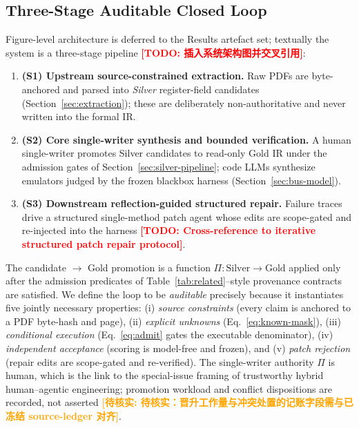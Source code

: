 \documentclass[preprint,review]{elsarticle}
\theoremstyle{definition}
\newcommand{\todo}[1]{\textcolor{red}{\textbf{[TODO: #1]}}}
\newcommand{\unverified}[1]{\textcolor{orange}{\textbf{[待核实: #1]}}}
\begin{document}
\subsection{Three-Stage Auditable Closed Loop}
\label{sec:architecture}

Figure-level architecture is deferred to the Results artefact set; textually the system is a
three-stage pipeline \todo{插入系统架构图并交叉引用}:

\begin{enumerate}
\item \textbf{(S1) Upstream source-constrained extraction.} Raw PDFs are byte-anchored and
parsed into \emph{Silver} register-field candidates (Section~\ref{sec:extraction}); these
are deliberately non-authoritative and never written into the formal IR.
\item \textbf{(S2) Core single-writer synthesis and bounded verification.} A human
single-writer promotes Silver candidates to read-only Gold IR under the admission gates of
Section~\ref{sec:silver-pipeline}; code LLMs synthesize emulators judged by the frozen
blackbox harness (Section~\ref{sec:bus-model}).
\item \textbf{(S3) Downstream reflection-guided structured repair.} Failure traces drive a
structured single-method patch agent whose edits are scope-gated and re-injected into the
harness \todo{Cross-reference to iterative structured patch repair protocol}.
\end{enumerate}

The candidate $\to$ Gold promotion is a function $\Pi:\mathrm{Silver}\rightarrow
\mathrm{Gold}$ applied only after the admission predicates of
Table~\ref{tab:related}--style provenance contracts are satisfied. We define the loop to be
\emph{auditable} precisely because it instantiates five jointly necessary properties:
(i) \emph{source constraints} (every claim is anchored to a PDF byte-hash and page),
(ii) \emph{explicit unknowns} (Eq.~\eqref{eq:known-mask}), (iii) \emph{conditional
execution} (Eq.~\eqref{eq:admit} gates the executable denominator), (iv) \emph{independent
acceptance} (scoring is model-free and frozen), and (v) \emph{patch rejection} (repair edits
are scope-gated and re-verified). The single-writer authority $\Pi$ is human, which is the
link to the special-issue framing of trustworthy hybrid human--agentic engineering;
promotion workload and conflict dispositions are recorded, not asserted
\unverified{待核实：晋升工作量与冲突处置的记账字段需与已冻结 source-ledger 对齐}.
\end{document}
